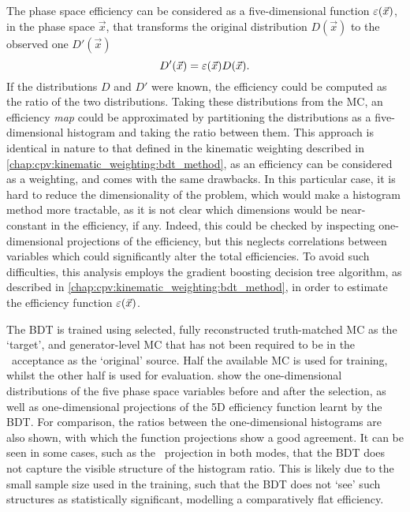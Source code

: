 The phase space efficiency can be considered as a five-dimensional function 
$\varepsilon(\vec{x})$, in the phase space $\vec{x}$, that transforms the original 
distribution $D(\vec{x})$ to the observed one $D'(\vec{x})$
\begin{equation}
  D'(\vec{x}) = \varepsilon(\vec{x})D(\vec{x}).
\end{equation}
If the distributions $D$ and $D'$ were known, the efficiency could be computed 
as the ratio of the two distributions.
Taking these distributions from the \ac{MC}, an efficiency \emph{map} could be 
approximated by partitioning the distributions as a five-dimensional histogram 
and taking the ratio between them.
This approach is identical in nature to that defined in the kinematic weighting 
described in \cref{chap:cpv:kinematic_weighting:bdt_method}, as an efficiency 
can be considered as a weighting, and comes with the same drawbacks.
In this particular case, it is hard to reduce the dimensionality of the 
problem, which would make a histogram method more tractable, as it is not clear 
which dimensions would be near-constant in the efficiency, if any.
Indeed, this could be checked by inspecting one-dimensional projections of the 
efficiency, but this neglects correlations between variables which could 
significantly alter the total efficiencies.
To avoid such difficulties, this analysis employs the gradient boosting 
decision tree algorithm, as described in 
\cref{chap:cpv:kinematic_weighting:bdt_method}, in order to estimate the 
efficiency function $\varepsilon(\vec{x})$.

The \ac{BDT} is trained using selected, fully reconstructed truth-matched 
\ac{MC} as the `target', and generator-level \ac{MC} that has not been required 
to be in the \lhcb\ acceptance as the `original' source.
Half the available \ac{MC} is used for training, whilst the other half is used 
for evaluation.
 show the one-dimensional 
distributions of the five phase space variables before and after the selection, 
as well as one-dimensional projections of the 5D efficiency function learnt by 
the \ac{BDT}.
For comparison, the ratios between the one-dimensional histograms are also 
shown, with which the function projections show a good agreement.
It can be seen in some cases, such as the \phihh\ projection in both modes, 
that the \ac{BDT} does not capture the visible structure of the histogram 
ratio.
This is likely due to the small sample size used in the training, such that the 
\ac{BDT} does not `see' such structures as statistically significant, modelling 
a comparatively flat efficiency.

